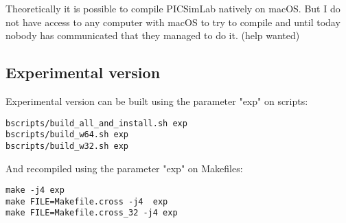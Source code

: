 Theoretically it is possible to compile PICSimLab natively on macOS. But I do not have access to any computer
 with macOS to try to compile and until today nobody has communicated that they managed to do it. (help wanted) 


\subsection{Experimental version}

Experimental version can be built using the parameter "exp" on scripts:
\begin{verbatim}
bscripts/build_all_and_install.sh exp
bscripts/build_w64.sh exp
bscripts/build_w32.sh exp
\end{verbatim}
And recompiled using the parameter "exp" on Makefiles:
\begin{verbatim}
make -j4 exp
make FILE=Makefile.cross -j4  exp
make FILE=Makefile.cross_32 -j4 exp
\end{verbatim}
 
